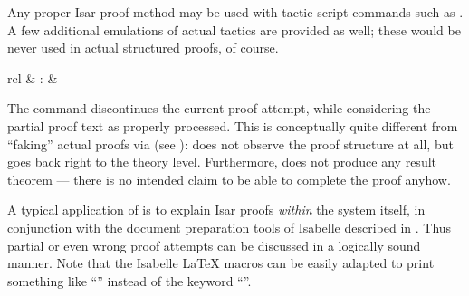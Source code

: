 \begin{isabellebody}
\begin{isamarkuptext}
  Any proper Isar proof method may be used with tactic script commands
  such as \hyperlink{command.apply}{\mbox{}}.  A few additional emulations of actual
  tactics are provided as well; these would be never used in actual
  structured proofs, of course.%
\end{isamarkuptext}%
\isamarkuptrue%
%
\isamarkuptrue%
%
\begin{isamarkuptext}%
\begin{matharray}{rcl}
    \hypertarget{command.oops}{\hyperlink{command.oops}{\mbox{}}} & : &  \\
  \end{matharray}

  The \hyperlink{command.oops}{\mbox{}} command discontinues the current proof
  attempt, while considering the partial proof text as properly
  processed.  This is conceptually quite different from ``faking''
  actual proofs via \hyperlink{command.sorry}{\mbox{}} (see
  ): \hyperlink{command.oops}{\mbox{}} does not observe the
  proof structure at all, but goes back right to the theory level.
  Furthermore, \hyperlink{command.oops}{\mbox{}} does not produce any result theorem
  --- there is no intended claim to be able to complete the proof
  anyhow.

  A typical application of \hyperlink{command.oops}{\mbox{}} is to explain Isar proofs
  \emph{within} the system itself, in conjunction with the document
  preparation tools of Isabelle described in \cite{isabelle-sys}.
  Thus partial or even wrong proof attempts can be discussed in a
  logically sound manner.  Note that the Isabelle {\LaTeX} macros can
  be easily adapted to print something like ``\isa{{\isachardoublequote}{\isasymdots}{\isachardoublequote}}'' instead of
  the keyword ``\hyperlink{command.oops}{\mbox{}}''.


\end{isamarkuptext}
\end{isabellebody}
